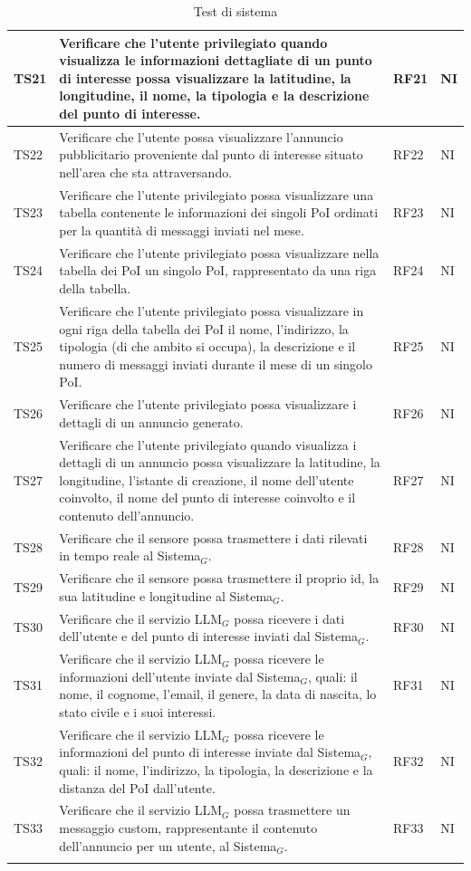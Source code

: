 \documentclass[10pt]{article}
\begin{document}
\begin{justify}
\begin{longtable}{|>{\centering\arraybackslash}m{2cm}|>{\centering\arraybackslash}m{7cm}|>{\centering\arraybackslash}m{2cm}|>{\centering\arraybackslash}m{2cm}|}
\hline
TS21 & Verificare che l'utente privilegiato quando visualizza le informazioni dettagliate di un punto di interesse possa visualizzare la latitudine, la longitudine, il nome, la tipologia e la descrizione del punto di interesse. & RF21 & NI \\
\hline
TS22 & Verificare che l'utente possa visualizzare l'annuncio pubblicitario proveniente dal punto di interesse situato nell'area che sta attraversando. & RF22 & NI \\
\hline
TS23 & Verificare che l'utente privilegiato possa visualizzare una tabella contenente le informazioni dei singoli PoI ordinati per la quantità di messaggi inviati nel mese. & RF23 & NI \\
\hline
TS24 & Verificare che l'utente privilegiato possa visualizzare nella tabella dei PoI un singolo PoI, rappresentato da una riga della tabella. & RF24 & NI \\
\hline
TS25 & Verificare che l'utente privilegiato possa visualizzare in ogni riga della tabella dei PoI il nome, l'indirizzo, la tipologia (di che ambito si occupa), la descrizione e il numero di messaggi inviati durante il mese di un singolo PoI. & RF25 & NI \\
\hline
TS26 & Verificare che l'utente privilegiato possa visualizzare i dettagli di un annuncio generato. & RF26 & NI \\
\hline
TS27 & Verificare che l'utente privilegiato quando visualizza i dettagli di un annuncio possa visualizzare la latitudine, la longitudine, l'istante di creazione, il nome dell'utente coinvolto, il nome del punto di interesse coinvolto e il contenuto dell'annuncio. & RF27 & NI \\
\hline
TS28 & Verificare che il sensore possa trasmettere i dati rilevati in tempo reale al Sistema$_G$. & RF28 & NI\\
\hline
TS29 & Verificare che il sensore possa trasmettere il proprio id, la sua latitudine e longitudine al Sistema$_G$. & RF29 & NI\\
\hline
TS30 & Verificare che il servizio LLM$_G$ possa ricevere i dati dell'utente e del punto di interesse inviati dal Sistema$_G$. & RF30 & NI \\
\hline
TS31 & Verificare che il servizio LLM$_G$ possa ricevere le informazioni dell'utente inviate dal Sistema$_G$, quali: il nome, il cognome, l'email, il genere, la data di nascita, lo stato civile e i suoi interessi. & RF31 & NI \\
\hline
TS32 & Verificare che il servizio LLM$_G$ possa ricevere le informazioni del punto di interesse inviate dal Sistema$_G$, quali: il nome, l'indirizzo, la tipologia, la descrizione e la distanza del PoI dall'utente. & RF32 & NI \\
\hline
TS33 & Verificare che il servizio LLM$_G$ possa trasmettere un messaggio custom, rappresentante il contenuto dell'annuncio per un utente, al Sistema$_G$. & RF33 & NI \\
\hline
\caption{Test di sistema}\\
\end{longtable}


\end{justify}
\end{document}
